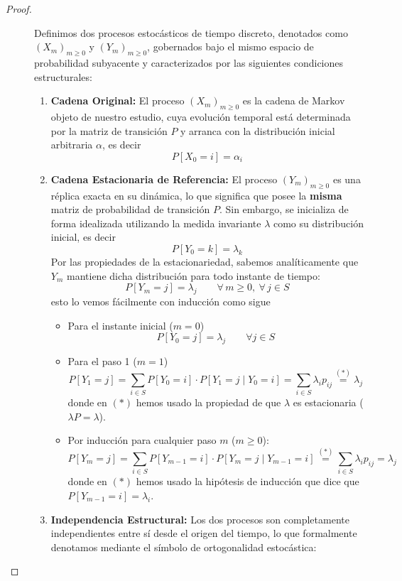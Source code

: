 \begin{teo}
\begin{proof}
\begin{description}
    \item[] Definimos dos procesos estocásticos de tiempo discreto, denotados como $(X_m)_{m \ge 0}$ y $(Y_m)_{m \ge 0}$, gobernados bajo el mismo espacio de probabilidad subyacente y caracterizados por las siguientes condiciones estructurales:
    \begin{enumerate}
        \item[\textbf{1)}] \textbf{Cadena Original:} El proceso $(X_m)_{m \ge 0}$ es la cadena de Markov objeto de nuestro estudio, cuya evolución temporal está determinada por la matriz de transición $P$ y arranca con la distribución inicial arbitraria $\alpha$, es decir
        $$P[X_0 = i] = \alpha_i$$
        \item[\textbf{2)}] \textbf{Cadena Estacionaria de Referencia:} El proceso $(Y_m)_{m \ge 0}$ es una réplica exacta en su dinámica, lo que significa que posee la \textbf{misma} matriz de probabilidad de transición $P$. Sin embargo, se inicializa de forma idealizada utilizando la medida invariante $\lambda$ como su distribución inicial, es decir
        $$P[Y_0 = k] = \lambda_k$$
        Por las propiedades de la estacionariedad, sabemos analíticamente que $Y_m$ mantiene dicha distribución para todo instante de tiempo:
        \[
        P[Y_m = j] = \lambda_j \qquad \forall \, m \ge 0, \ \forall \, j \in S
        \]
        esto lo vemos fácilmente con inducción como sigue
        \begin{itemize}
            \item Para el instante inicial ($m=0$)
            $$P[Y_0 = j] = \lambda_j \qquad \forall j \in S$$
            \item Para el paso 1 ($m=1$)
            $$P[Y_1 = j] = \sum_{i \in S} P[Y_0 = i] \cdot P[Y_1 = j \mid Y_0 = i]=\sum_{i \in S} \lambda_i p_{ij}\overset{(*)}{=} \lambda_j$$
            donde en $(*)$ hemos usado la propiedad de que $\lambda$ es estacionaria ($\lambda P = \lambda$).
            \item Por inducción para cualquier paso $m$ ($m \ge 0$):
            $$P[Y_m = j] = \sum_{i \in S} P[Y_{m-1} = i] \cdot P[Y_m = j \mid Y_{m-1} = i]\overset{(*)}{=}\sum_{i \in S} \lambda_i p_{ij}=\lambda_j$$
            donde en $(*)$ hemos usado la hipótesis de inducción que dice que $P[Y_{m-1} = i] = \lambda_i$.
        \end{itemize}
        \item[\textbf{3)}] \textbf{Independencia Estructural:} Los dos procesos son completamente independientes entre sí desde el origen del tiempo, lo que formalmente denotamos mediante el símbolo de ortogonalidad estocástica:

\end{enumerate}
\end{description}
\end{proof}
\end{teo}
